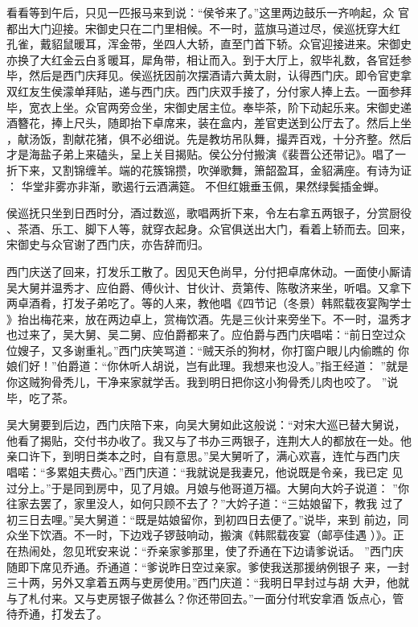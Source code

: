 看看等到午后，只见一匹报马来到说：“侯爷来了。”这里两边鼓乐一齐响起，众
官都出大门迎接。宋御史只在二门里相候。不一时，蓝旗马道过尽，侯巡抚穿大红
孔雀，戴貂鼠暖耳，浑金带，坐四人大轿，直至门首下轿。众官迎接进来。宋御史
亦换了大红金云白豸暖耳，犀角带，相让而入。到于大厅上，叙毕礼数，各官廷参
毕，然后是西门庆拜见。侯巡抚因前次摆酒请六黄太尉，认得西门庆。即令官吏拿
双红友生侯濛单拜贴，递与西门庆。西门庆双手接了，分付家人捧上去。一面参拜
毕，宽衣上坐。众官两旁佥坐，宋御史居主位。奉毕茶，阶下动起乐来。宋御史递
酒簪花，捧上尺头，随即抬下卓席来，装在盒内，差官吏送到公厅去了。然后上坐
，献汤饭，割献花猪，俱不必细说。先是教坊吊队舞，撮弄百戏，十分齐整。然后
才是海盐子弟上来磕头，呈上关目揭贴。侯公分付搬演《裴晋公还带记》。唱了一
折下来，又割锦缠羊。端的花簇锦攒，吹弹歌舞，箫韶盈耳，金貂满座。有诗为证
：
华堂非雾亦非渐，歌遏行云酒满筵。
不但红娥垂玉佩，果然绿鬓插金蝉。

侯巡抚只坐到日西时分，酒过数巡，歌唱两折下来，令左右拿五两银子，分赏厨役
、茶酒、乐工、脚下人等，就穿衣起身。众官俱送出大门，看着上轿而去。回来，
宋御史与众官谢了西门庆，亦告辞而归。

西门庆送了回来，打发乐工散了。因见天色尚早，分付把卓席休动。一面使小厮请
吴大舅并温秀才、应伯爵、傅伙计、甘伙计、贲第传、陈敬济来坐，听唱。又拿下
两卓酒肴，打发子弟吃了。等的人来，教他唱《四节记（冬景）韩熙载夜宴陶学士
》抬出梅花来，放在两边卓上，赏梅饮酒。先是三伙计来旁坐下。不一时，温秀才
也过来了，吴大舅、吴二舅、应伯爵都来了。应伯爵与西门庆唱喏：“前日空过众
位嫂子，又多谢重礼。”西门庆笑骂道：“贼天杀的狗材，你打窗户眼儿内偷瞧的
你娘们好！”伯爵道：“你休听人胡说，岂有此理。我想来也没人。”指王经道：
”就是你这贼狗骨秃儿，干净来家就学舌。我到明日把你这小狗骨秃儿肉也咬了。
”说毕，吃了茶。

吴大舅要到后边，西门庆陪下来，向吴大舅如此这般说：“对宋大巡已替大舅说，
他看了揭贴，交付书办收了。我又与了书办三两银子，连荆大人的都放在一处。他
亲口许下，到明日类本之时，自有意思。”吴大舅听了，满心欢喜，连忙与西门庆
唱喏：“多累姐夫费心。”西门庆道：“我就说是我妻兄，他说既是令亲，我已定
见过分上。”于是同到房中，见了月娘。月娘与他哥道万福。大舅向大妗子说道：
”你往家去罢了，家里没人，如何只顾不去了？”大妗子道：“三姑娘留下，教我
过了初三日去哩。”吴大舅道：“既是姑娘留你，到初四日去便了。”说毕，来到
前边，同众坐下饮酒。不一时，下边戏子锣鼓响动，搬演《韩熙载夜宴（邮亭佳遇
）》。正在热闹处，忽见玳安来说：“乔亲家爹那里，使了乔通在下边请爹说话。
”西门庆随即下席见乔通。乔通道：“爹说昨日空过亲家。爹使我送那援纳例银子
来，一封三十两，另外又拿着五两与吏房使用。”西门庆道：“我明日早封过与胡
大尹，他就与了札付来。又与吏房银子做甚么？你还带回去。”一面分付玳安拿酒
饭点心，管待乔通，打发去了。

